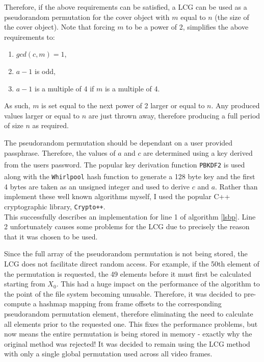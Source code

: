 \documentclass[paper=a4, fontsize=11pt,twoside]{scrartcl}
\numberwithin{table}{section}
\numberwithin{figure}{section}
\numberwithin{algorithm}{section}
\begin{document}
\noindent
Therefore, if the above requirements can be satisfied, a LCG can be used as a pseudorandom permutation for the cover object with $m$ equal to $n$ (the size of the cover object). Note that forcing $m$ to be a power of 2, simplifies the above requirements to:
\begin{enumerate}
	\item $gcd(c, m) = 1$,
	\item $a-1$ is odd,
	\item $a-1$ is a multiple of 4 if $m$ is a multiple of 4.
\end{enumerate}

\noindent
As such, $m$ is set equal to the next power of 2 larger or equal to $n$. Any produced values larger or equal to $n$ are just thrown away, therefore producing a full period of size $n$ as required.

The pseudorandom permutation should be dependant on a user provided passphrase. Therefore, the values of $a$ and $c$ are determined using a key derived from the users password. The popular key derivation function \texttt{PBKDF2}\textsuperscript{\cite{keyd}} is used along with the \texttt{Whirlpool}\textsuperscript{\cite{pool}} hash function to generate a 128 byte key and the first 4 bytes are taken as an unsigned integer and used to derive $c$ and $a$. Rather than implement these well known algorithms myself, I used the popular C++ cryptographic library, \texttt{Crypto++}.\\

\noindent
This successfully describes an implementation for line 1 of algorithm \ref{lsbp}. Line 2 unfortunately causes some problems for the LCG due to precisely the reason that it was chosen to be used.

Since the full array of the pseudorandom permutation is not being stored, the LCG does not facilitate direct random access. For example, if the 50th element of the permutation is requested, the 49 elements before it must first be calculated starting from $X_{0}$. This had a huge impact on the performance of the algorithm to the point of the file system becoming unusable. Therefore, it was decided to pre-compute a hashmap mapping from frame offsets to the corresponding pseudorandom permutation element, therefore eliminating the need to calculate all elements prior to the requested one. This fixes the performance problems, but now means the entire permutation is being stored in memory - exactly why the original method was rejected! It was decided to remain using the LCG method with only a single global permutation used across all video frames.
\end{document}
